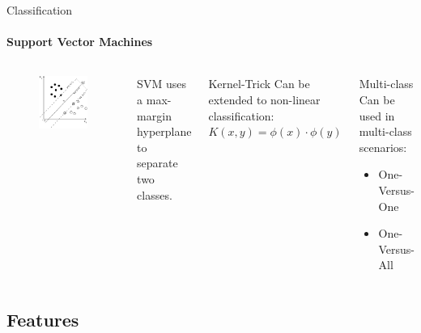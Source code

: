 \documentclass[compress]{beamer}
\begin{document}
\begin{frame}{Classification}
\framesubtitle{Support Vector Machines}
    \begin{columns}[t]
    \begin{figure}
        \includegraphics[width=.75\textwidth]{Svm_max_sep_hyperplane_with_margin}
    \end{figure}
        SVM uses a max-margin hyperplane to separate two classes.
    \begin{block}{Kernel-Trick}
        Can be extended to non-linear classification:\\
        $K(x, y) = \phi(x)\cdot\phi(y)$
    \end{block}
    \begin{block}{Multi-class}
        Can be used in multi-class scenarios:
        \begin{itemize}
            \item One-Versus-One
            \item One-Versus-All
        \end{itemize}
    \end{block}
    \end{columns}
\end{frame}

\subsection{Features}
\end{document}
